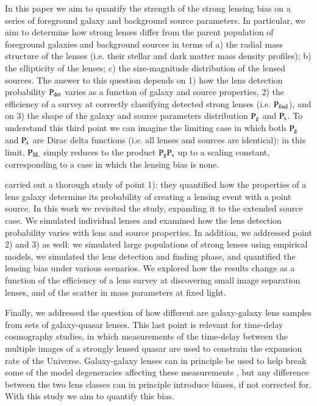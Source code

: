 \documentclass{aa}
\def\prlens{{\rm P}_\mathrm{g}}
\def\prsource{{\rm P}_\mathrm{s}}
\def\prsl{{\rm P}_\mathrm{{SL}}}
\def\pdet{{\rm P}_\mathrm{det}}
\def\pfind{{\rm P}_\mathrm{find}}
\begin{document}
In this paper we aim to quantify the strength of the strong lensing bias on a series of foreground galaxy and background source parameters. %
In particular, we aim to determine how strong lenses differ from the parent population of foreground galaxies and background sources in terms of a) the radial mass structure of the lenses (i.e. their stellar and dark matter mass density profiles); b) the ellipticity of the lenses; c) the size-magnitude distribution of the lensed sources.
The answer to this question depends on 1) how the lens detection probability $\pdet$ varies as a function of galaxy and source properties, 2) the efficiency of a survey at correctly classifying detected strong lenses (i.e. $\pfind$), and on 3) the shape of the galaxy and source parameters distribution $\prlens$ and $\prsource$. To understand this third point we can imagine the limiting case in which both $\prlens$ and $\prsource$ are Dirac delta functions (i.e. all lenses and sources are identical): in this limit, $\prsl$ simply reduces to the product $\prlens\prsource$ up to a scaling constant, corresponding to a case in which the lensing bias is none.

\citet{MVK09} carried out a thorough study of point 1): they quantified how the properties of a lens galaxy determine its probability of creating a lensing event with a point source.
In this work we revisited the \citet{MVK09} study, expanding it to the extended source case. We simulated individual lenses and examined how the lens detection probability varies with lens and source properties.
In addition, we addressed point 2) and 3) as well: we simulated large populations of strong lenses using empirical models, we simulated the lens detection and finding phase, and quantified the lensing bias under various scenarios.
We explored how the results change as a function of the efficiency of a lens survey at discovering small image separation lenses, and of the scatter in mass parameters at fixed light.

Finally, we addressed the question of how different are galaxy-galaxy lens samples from sets of galaxy-quasar lenses. This last point is relevant for time-delay cosmography studies, in which measurements of the time-delay between the multiple images of a strongly lensed quasar are used to constrain the expansion rate of the Universe. Galaxy-galaxy lenses can in principle be used to help break some of the model degeneracies affecting these measurements \citep{B+T21}, but any difference between the two lens classes can in principle introduce biases, if not corrected for.
With this study we aim to quantify this bias.
\end{document}
